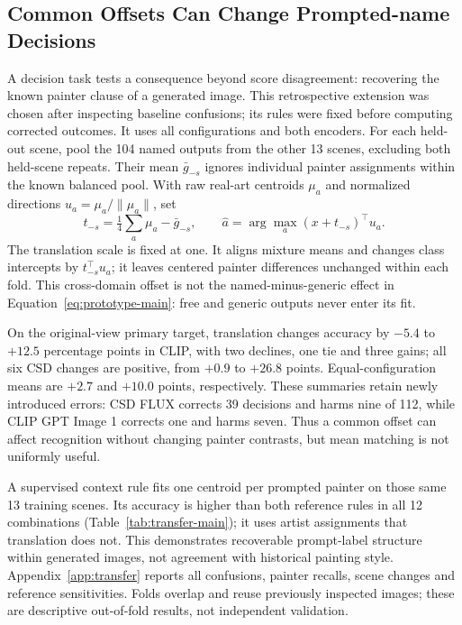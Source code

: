 \subsection{Common Offsets Can Change Prompted-name Decisions}\label{sec:transfer}
A decision task tests a consequence beyond score disagreement: recovering the
known painter clause of a generated image. This retrospective extension was
chosen after inspecting baseline confusions; its rules were fixed before
computing corrected outcomes. It uses all configurations and both encoders.
For each held-out scene, pool the 104 named outputs from the other 13 scenes,
excluding both held-scene repeats. Their mean $\bar g_{-s}$ ignores individual
painter assignments within the known balanced pool. With raw real-art centroids
$\mu_a$ and normalized directions $u_a=\mu_a/\|\mu_a\|$, set
\begin{equation}
 t_{-s}=\tfrac14\sum_a\mu_a-\bar g_{-s},\qquad
 \hat a=\arg\max_a (x+t_{-s})^\top u_a.
 \label{eq:transfer-main}
\end{equation}
The translation scale is fixed at one. It aligns mixture means and changes
class intercepts by $t_{-s}^\top u_a$; it leaves centered painter differences
unchanged within each fold. This cross-domain offset is not the
named-minus-generic effect in Equation~\ref{eq:prototype-main}: free and generic
outputs never enter its fit.



On the original-view primary target, translation changes accuracy by $-5.4$
to $+12.5$ percentage points in CLIP,
with two declines, one tie and three gains; all six CSD changes are positive,
from $+0.9$ to $+26.8$ points. Equal-configuration means are $+2.7$ and $+10.0$
points, respectively. These summaries retain newly introduced errors:
CSD FLUX corrects 39 decisions and harms nine of 112, while CLIP GPT Image 1
corrects one and harms seven. Thus a common offset can affect recognition
without changing painter contrasts, but mean matching is not uniformly useful.

A supervised context rule fits one centroid per prompted painter on those same
13 training scenes. Its accuracy is higher than both reference rules in all 12
combinations (Table~\ref{tab:transfer-main}); it uses artist assignments that
translation does not. This demonstrates recoverable prompt-label structure
within generated images, not agreement with historical painting style.
Appendix~\ref{app:transfer} reports all confusions, painter recalls, scene changes
and reference sensitivities. Folds overlap and reuse previously inspected
images; these are descriptive out-of-fold results, not independent validation.

